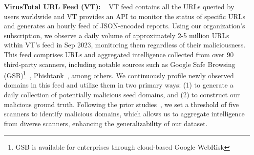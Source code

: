 \textbf{VirusTotal URL Feed (VT):} ~\cite{VirusTotal}
VT feed contains all the URLs queried by users worldwide and VT provides an API to monitor the status of specific URLs and generates an hourly feed of JSON-encoded reports. Using our organization's subscription, we observe a daily volume of approximately 2-5 million URLs within VT's feed in Sep 2023, monitoring them regardless of their maliciousness.
This feed comprises URLs and aggregated intelligence collected from over 90 third-party scanners, including notable sources such as Google Safe Browsing (GSB)\footnote{GSB is available for enterprises through cloud-based Google WebRisk}~\cite{GoogleSafeBrowsing}, Phishtank~\cite{phishtank}, among others. 
We continuously profile newly observed domains in this feed and utilize them in two primary ways: (1) to generate a daily collection of potentially malicious seed domains, and (2) to construct our malicious ground truth. Following the prior studies~\cite{phicious:raid:2022,comp_or_at:2021:usenix}, we set a threshold of five scanners to identify malicious domains, which allows us to aggregate intelligence from diverse scanners, enhancing the generalizability of our dataset. 


